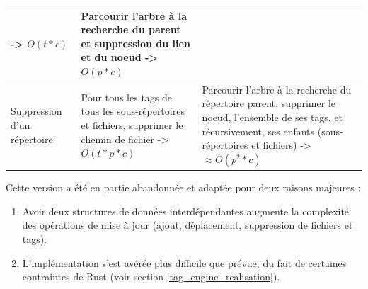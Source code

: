 \documentclass[a4paper, 12pt]{article}
\begin{document}
\begin{center}
\begin{tabularx}{16.5cm}{|p{3cm}|X|X|}
            -> $O(t * c)$ & Parcourir l'arbre à la recherche du parent et suppression du lien et 
            du noeud -> $O(p * c)$ \\ \hline
        Suppression d'un répertoire & Pour tous les tags de tous les sous-répertoires et fichiers, 
            supprimer le chemin de fichier -> $O(t * p * c)$ & Parcourir l'arbre à la recherche du 
            répertoire parent, supprimer le noeud, l'ensemble de ses tags, et récursivement, ses 
            enfants (sous-répertoires et fichiers) -> $\approx O(p^2 * c)$ \\ \hline
    \end{tabularx}
    \label{tableau_architecture_1}
\end{center}

Cette version a été en partie abandonnée et adaptée pour deux raisons majeures :
\begin{enumerate}
    \item Avoir deux structures de données interdépendantes augmente la complexité des 
        opérations de mise à jour (ajout, déplacement, suppression de fichiers et tags).
    \item L'implémentation s'est avérée plus difficile que prévue, du fait de certaines 
        contraintes de Rust (voir section \ref{tag_engine_realisation}).
\end{enumerate}
\end{document}
